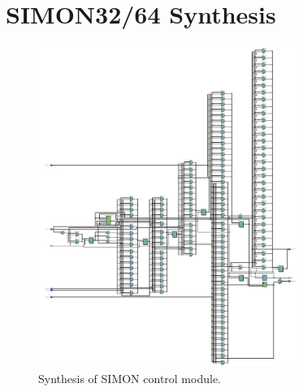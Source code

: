 \documentclass[12pt,twoside,a4paper]{report}
\begin{document}
    
    
     
    \appendix
    
    \chapter{SIMON32/64 Synthesis}
    \label{chapter:SYNTH}
    \begin{figure}[H]
        \includegraphics[width=0.75\textwidth]{SYNTHESIS}
        \centering
        \caption{Synthesis of SIMON control module.}
    \label{SV_Synth}
    \end{figure}
    
\end{document}
